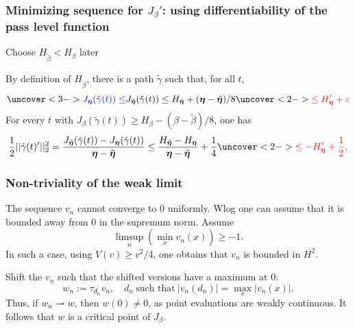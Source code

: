 \documentclass[9pt, english]{beamer}
\theoremstyle{definition}
\begin{document}
\begin{frame}
\frametitle{Minimizing sequence for $J_\beta'$: using
differentiability of the pass level function} Choose
$H_{\tilde\beta} < H_\beta$ later 

By definition of $H_{\tilde\beta}$, there is a path $\tilde\gamma$
such that, for all $t$,
\[
\uncover<3->{{\color{blue} J_\beta(\tilde\gamma(t)) \leq}}
J_{\tilde\beta} (\tilde\gamma(t)) \leq H_{\tilde\beta} + (\beta -
\tilde\beta)/8 \uncover<2->{{\color{red} \leq H_\beta' + \epsilon}}
\]
For every $t$ with $J_\beta(\tilde\gamma(t)) \geq H_\beta -
(\beta-\tilde\beta)/8$, one has
\[
\frac12 ||\tilde\gamma(t)'||_2^2 =
\frac{J_{\tilde\beta}(\tilde\gamma(t)) -
J_\beta(\tilde\gamma(t))}{\beta - \tilde\beta} \leq
\frac{H_{\tilde\beta} - H_\beta}{\beta - \tilde\beta} + \frac14
\uncover<2->{{\color{red} \leq - H'_\beta + \frac12,}}
\]

\end{frame}

\begin{frame}
\frametitle{Non-triviality of the weak limit} The sequence $v_n$
cannot converge to $0$ uniformly. Wlog one can assume that it is
bounded away from $0$ in the supremum norm. Assume
\[
\limsup_n (\min_x v_n(x)) \geq -1.
\]
In such a case, using $V(v) \geq v^2/4$, one obtains that $v_n$ is
bounded in $H^2$.

Shift the $v_n$ such that the shifted versions have a maximum at
$0$:
\[
w_n := \tau_{d_n} v_n, \quad d_n \ \text{such that}\  |v_n(d_n)| =
\max_x |v_n(x)|.
\]
Thus, if $w_n \rightharpoonup w$, then $w(0) \neq 0$, as point
evaluations are weakly continuous. It follows that $w$ is a critical
point of $J_\beta$.
\end{frame}


\end{document}
